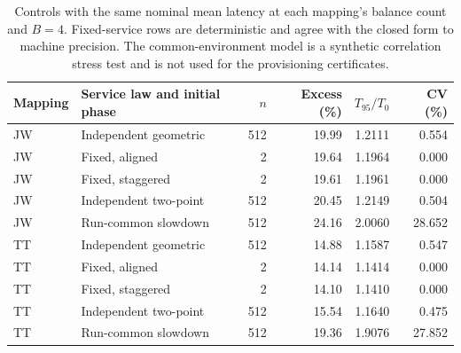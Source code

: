\begin{table}[htbp]
\centering\small
\begin{tabular}{llrrrr}
\toprule
Mapping & Service law and initial phase & $n$ & Excess (\%) & $T_{95}/T_0$ & CV (\%)\\\midrule
JW & Independent geometric & 512 & 19.99 & 1.2111 & 0.554\\
JW & Fixed, aligned & 2 & 19.64 & 1.1964 & 0.000\\
JW & Fixed, staggered & 2 & 19.61 & 1.1961 & 0.000\\
JW & Independent two-point & 512 & 20.45 & 1.2149 & 0.504\\
JW & Run-common slowdown & 512 & 24.16 & 2.0060 & 28.652\\
TT & Independent geometric & 512 & 14.88 & 1.1587 & 0.547\\
TT & Fixed, aligned & 2 & 14.14 & 1.1414 & 0.000\\
TT & Fixed, staggered & 2 & 14.10 & 1.1410 & 0.000\\
TT & Independent two-point & 512 & 15.54 & 1.1640 & 0.475\\
TT & Run-common slowdown & 512 & 19.36 & 1.9076 & 27.852\\
\bottomrule
\end{tabular}
\caption{Controls with the same nominal mean latency at each mapping's balance count and $B=4$. Fixed-service rows are deterministic and agree with the closed form to machine precision. The common-environment model is a synthetic correlation stress test and is not used for the provisioning certificates.}
\label{tab:laws}
\end{table}
